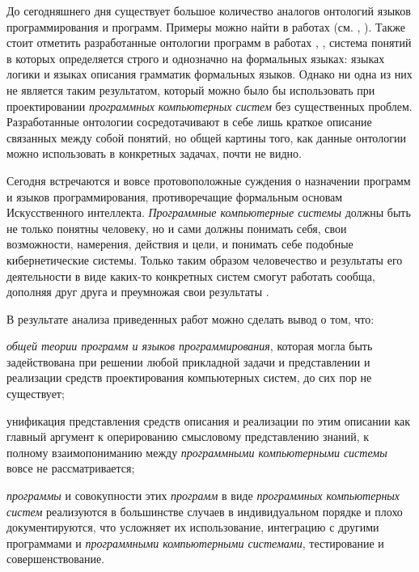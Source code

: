 До сегодняшнего дня существует большое количество аналогов онтологий языков программирования и программ. Примеры можно найти в работах (см. , ). Также стоит отметить разработанные онтологии программ в работах , , система понятий в которых определяется строго и однозначно на формальных языках: языках логики и языках описания грамматик формальных языков. Однако ни одна из них не является таким результатом, который можно было бы использовать при проектировании \textit{программных компьютерных систем} без существенных проблем. Разработанные онтологии сосредотачивают в себе лишь краткое описание связанных между собой понятий, но общей картины того, как данные онтологии можно использовать в конкретных задачах, почти не видно.

Сегодня встречаются и вовсе протовоположные суждения о назначении программ и языков программирования, противоречащие формальным основам Искусственного интеллекта. \textit{Программные компьютерные системы} должны быть не только понятны человеку, но и сами должны понимать себя, свои возможности, намерения, действия и цели, и понимать себе подобные кибернетические системы. Только таким образом человечество и результаты его деятельности в виде каких-то конкретных систем смогут работать сообща, дополняя друг друга и преумножая свои результаты .

В результате анализа приведенных работ можно сделать вывод о том, что:
\begin{textitemize}
    \item \textit{общей теории программ и языков программирования}, которая могла быть задействована при решении любой прикладной задачи и представлении и реализации средств проектирования компьютерных систем, до сих пор не существует;
    \item унификация представления средств описания и реализации по этим описании как главный аргумент к оперированию смысловому представлению знаний, к полному взаимопониманию между \textit{программными компьютерными системы} вовсе не рассматривается;
    \item \textit{программы} и совокупности этих \textit{программ} в виде \textit{программных компьютерных систем} реализуются в большинстве случаев в индивидуальном порядке и плохо документируются, что усложняет их использование, интеграцию с другими программами и \textit{программными компьютерными системами}, тестирование и совершенствование.
\end{textitemize}

